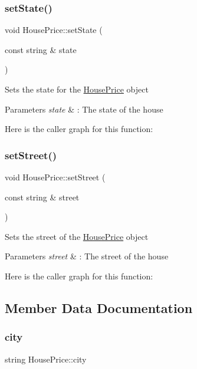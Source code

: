 \subsubsection{\texorpdfstring{set\+State()}{setState()}}
{\footnotesize\ttfamily void House\+Price\+::set\+State (\begin{DoxyParamCaption}\item[{const string \&}]{state }\end{DoxyParamCaption})}

Sets the state for the \hyperlink{class_house_price}{House\+Price} object 
\begin{DoxyParams}{Parameters}
{\em state} & \+: The state of the house \\
\hline
\end{DoxyParams}
Here is the caller graph for this function\+:
\mbox{\label{class_house_price_a959c75ef1193d885fca7c3410db29ee9}} 
\subsubsection{\texorpdfstring{set\+Street()}{setStreet()}}
{\footnotesize\ttfamily void House\+Price\+::set\+Street (\begin{DoxyParamCaption}\item[{const string \&}]{street }\end{DoxyParamCaption})}

Sets the street of the \hyperlink{class_house_price}{House\+Price} object 
\begin{DoxyParams}{Parameters}
{\em street} & \+: The street of the house \\
\hline
\end{DoxyParams}
Here is the caller graph for this function\+:


\subsection{Member Data Documentation}
\mbox{\label{class_house_price_a3b62ff8d207b47b12850cd7ebce32b44}} 
\subsubsection{\texorpdfstring{city}{city}}
{\footnotesize\ttfamily string House\+Price\+::city\hspace{0.3cm}{\ttfamily [private]}}

